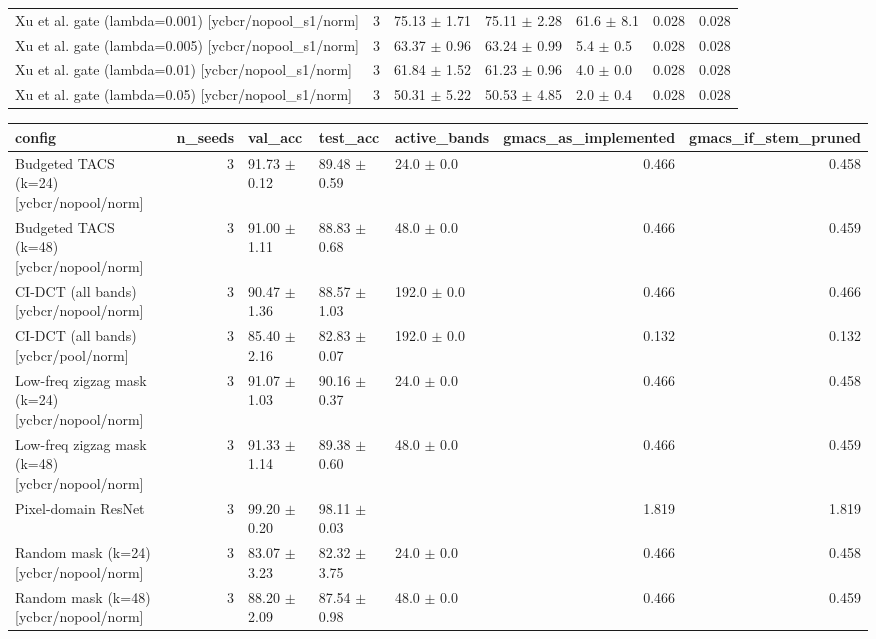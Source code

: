 \begin{tabular}{lrlllrr}
Xu et al. gate (lambda=0.001) [ycbcr/nopool_s1/norm] & 3 & 75.13 $\pm$ 1.71 & 75.11 $\pm$ 2.28 & 61.6 $\pm$ 8.1 & 0.028 & 0.028 \\
Xu et al. gate (lambda=0.005) [ycbcr/nopool_s1/norm] & 3 & 63.37 $\pm$ 0.96 & 63.24 $\pm$ 0.99 & 5.4 $\pm$ 0.5 & 0.028 & 0.028 \\
Xu et al. gate (lambda=0.01) [ycbcr/nopool_s1/norm] & 3 & 61.84 $\pm$ 1.52 & 61.23 $\pm$ 0.96 & 4.0 $\pm$ 0.0 & 0.028 & 0.028 \\
Xu et al. gate (lambda=0.05) [ycbcr/nopool_s1/norm] & 3 & 50.31 $\pm$ 5.22 & 50.53 $\pm$ 4.85 & 2.0 $\pm$ 0.4 & 0.028 & 0.028 \\
\bottomrule
\end{tabular}

\begin{tabular}{lrlllrr}
\toprule
config & n_seeds & val_acc & test_acc & active_bands & gmacs_as_implemented & gmacs_if_stem_pruned \\
\midrule
Budgeted TACS (k=24) [ycbcr/nopool/norm] & 3 & 91.73 $\pm$ 0.12 & 89.48 $\pm$ 0.59 & 24.0 $\pm$ 0.0 & 0.466 & 0.458 \\
Budgeted TACS (k=48) [ycbcr/nopool/norm] & 3 & 91.00 $\pm$ 1.11 & 88.83 $\pm$ 0.68 & 48.0 $\pm$ 0.0 & 0.466 & 0.459 \\
CI-DCT (all bands) [ycbcr/nopool/norm] & 3 & 90.47 $\pm$ 1.36 & 88.57 $\pm$ 1.03 & 192.0 $\pm$ 0.0 & 0.466 & 0.466 \\
CI-DCT (all bands) [ycbcr/pool/norm] & 3 & 85.40 $\pm$ 2.16 & 82.83 $\pm$ 0.07 & 192.0 $\pm$ 0.0 & 0.132 & 0.132 \\
Low-freq zigzag mask (k=24) [ycbcr/nopool/norm] & 3 & 91.07 $\pm$ 1.03 & 90.16 $\pm$ 0.37 & 24.0 $\pm$ 0.0 & 0.466 & 0.458 \\
Low-freq zigzag mask (k=48) [ycbcr/nopool/norm] & 3 & 91.33 $\pm$ 1.14 & 89.38 $\pm$ 0.60 & 48.0 $\pm$ 0.0 & 0.466 & 0.459 \\
Pixel-domain ResNet & 3 & 99.20 $\pm$ 0.20 & 98.11 $\pm$ 0.03 &  & 1.819 & 1.819 \\
Random mask (k=24) [ycbcr/nopool/norm] & 3 & 83.07 $\pm$ 3.23 & 82.32 $\pm$ 3.75 & 24.0 $\pm$ 0.0 & 0.466 & 0.458 \\
Random mask (k=48) [ycbcr/nopool/norm] & 3 & 88.20 $\pm$ 2.09 & 87.54 $\pm$ 0.98 & 48.0 $\pm$ 0.0 & 0.466 & 0.459 \\
\bottomrule
\end{tabular}

